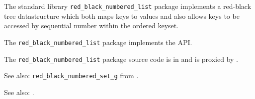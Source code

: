 

The standard library {\tt red\_black\_numbered\_list} package implements a red-black tree 
datastructure which both maps keys to values and also allows keys to 
be accessed by sequential number within the ordered keyset.

The {\tt red\_black\_numbered\_list} package implements the  API.

The {\tt red\_black\_numbered\_list} package source code is in  
and is proxied by .

See also:  {\tt red\_black\_numbered\_set\_g} from 
.

See also:  .